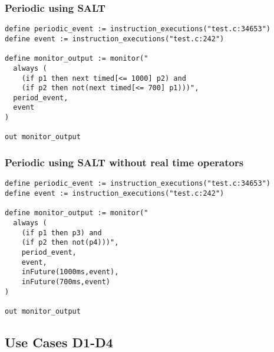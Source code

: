 \subsubsection{Periodic using SALT}

\begin{lstlisting}[language=tessla+salt]
define periodic_event := instruction_executions("test.c:34653")
define event := instruction_executions("test.c:242")

define monitor_output := monitor("
  always (
    (if p1 then next timed[<= 1000] p2) and 
    (if p2 then not(next timed[<= 700] p1)))",
  period_event,
  event
)

out monitor_output
\end{lstlisting}






\subsubsection{Periodic using SALT without real time operators}

\begin{lstlisting}[language=tessla+salt]
define periodic_event := instruction_executions("test.c:34653")
define event := instruction_executions("test.c:242")

define monitor_output := monitor("
  always (
    (if p1 then p3) and 
    (if p2 then not(p4)))",
    period_event,
    event,
    inFuture(1000ms,event),
    inFuture(700ms,event)
)

out monitor_output
\end{lstlisting}

\subsection{Use Cases D1-D4}

